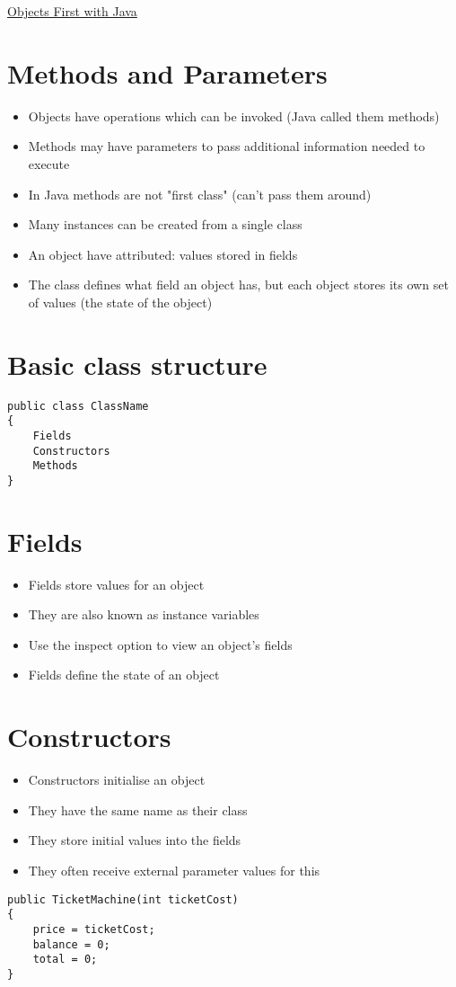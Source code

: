 \documentclass{article}[18pt]
\begin{document}
\begin{center}
\underline{\huge Objects First with Java}
\end{center}
\section{Methods and Parameters}
\begin{itemize}
	\item Objects have operations which can be invoked (Java called them methods)
	\item Methods may have parameters to pass additional information needed to execute
	\item In Java methods are not "first class" (can't pass them around)
	\item Many instances can be created from a single class
	\item An object have attributed: values stored in fields
	\item The class defines what field an object has, but each object stores its own set of values (the state of the object)
\end{itemize}
\section{Basic class structure}
\begin{verbatim}
public class ClassName
{
	Fields
	Constructors
	Methods
} 
\end{verbatim}
\section{Fields}
\begin{itemize}
	\item Fields store values for an object
	\item They are also known as instance variables
	\item Use the inspect option to view an object's fields
	\item Fields define the state of an object
\end{itemize}
\section{Constructors}
\begin{itemize}
	\item Constructors initialise an object
	\item They have the same name as their class
	\item They store initial values into the fields
	\item They often receive external parameter values for this
\end{itemize}
\begin{verbatim}
public TicketMachine(int ticketCost)
{
	price = ticketCost;
	balance = 0;
	total = 0;
}
\end{verbatim}
\end{document}
